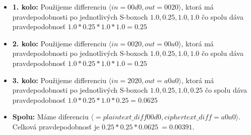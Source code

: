 \begin{itemize}
\item {\bf 1. kolo:}
Použijeme differenciu $\langle in= 00d0 , out= 0020 \rangle $,
ktorá má pravdepodobnosti po jednotlivých S-boxoch $
1.0,0.25,1.0,1.0
$ čo spolu dáva pravdepodobnosť 
$ 1.0*0.25*1.0*1.0 = 0.25 $

\item {\bf 2. kolo:}
Použijeme differenciu $\langle in= 0020 , out= 00a0 \rangle $,
ktorá má pravdepodobnosti po jednotlivých S-boxoch $
1.0,0.25,1.0,1.0
$ čo spolu dáva pravdepodobnosť 
$ 1.0*0.25*1.0*1.0 = 0.25 $

\item {\bf 3. kolo:}
Použijeme differenciu $\langle in= 2020 , out= a0a0 \rangle $,
ktorá má pravdepodobnosti po jednotlivých S-boxoch $
1.0,0.25,1.0,0.25
$ čo spolu dáva pravdepodobnosť 
$ 1.0*0.25*1.0*0.25 = 0.0625 $

\item {\bf Spolu:}  Máme diferenciu $\langle = plaintext\_diff 00d0 , ciphertext\_diff= a0a0 \rangle$.
Celková pravdepodobnosť je $ 0.25*0.25*0.0625 ~= 0.00391 $.
\end{itemize}
